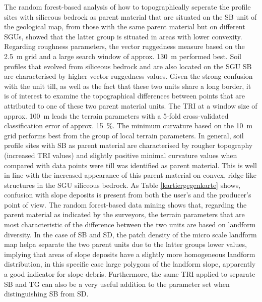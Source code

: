 \documentclass[preprint,12pt,authoryear]{elsarticle}
\begin{document}
The random forest-based analysis of how to topographically seperate the profile sites with siliceous bedrock as parent material that are situated on the SB unit of the geological map, from those with the same parent material but on different SGUs, showed that the latter group is situated in areas with lower convexity. Regarding roughness parameters, the vector ruggedness measure based on the 2.5~m grid and a large search window of approx. 130~m performed best. Soil profiles that evolved from siliceous bedrock and are also located on the SGU SB are characterised by higher vector ruggedness values. 
Given the strong confusion with the unit till, as well as the fact that these two units share a long border, it is of interest to examine the topographical differences between points that are attributed to one of these two parent material units. The TRI at a window size of approx. 100~m leads the terrain parameters with a 5-fold cross-validated classification error of approx. 15~\%. The minimum curvature based on the 10~m grid performs best from the group of local terrain parameters. In general, soil profile sites with SB as parent material are characterised by rougher topography (increased TRI values) and slightly positive minimal curvature values when compared with data points were till was identified as parent material. This is well in line with the increased appearance of this parent material on  convex, ridge-like structures in the SGU siliceous bedrock. As Table \ref{kartiergegenkarte} shows, confusion with slope deposits is present from both the user's and the producer's point of view. The random forest-based data mining shows that, regarding the parent material as indicated by the surveyors, the terrain parameters that are most characteristic of the difference between the two units are based on landform diversity. In the case of SB and SD, the patch density of the micro scale landform map helpa separate the two parent units due to the latter groups lower values, implying that areas of slope deposits have a slightly more homogeneous landform distribution, in this specific case large polygons of the landform slope, apparently a good indicator for slope debris.  Furthermore, the same TRI applied to separate SB and TG can also be a very useful addition to the parameter set when distinguishing SB from SD. 
\end{document}
